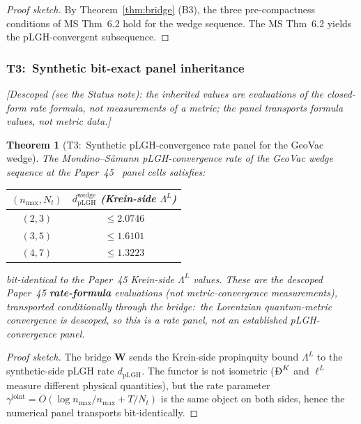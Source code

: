 \documentclass[11pt,a4paper]{article}
\theoremstyle{plain}
\newtheorem{theorem}{Theorem}[section]
\theoremstyle{definition}
\newcommand{\nmax}{n_{\max}}
\newcommand{\Nt}{N_{t}}
\newcommand{\gammajoint}{\gamma^{\mathrm{joint}}}
\newcommand{\Lprop}{\Lambda^{L}}
\newcommand{\BigDeth}{\text{\DJ}^{K}}
\newcommand{\Wfun}{\mathbf{W}}
\begin{document}
\begin{proof}[Proof sketch]
By Theorem~\ref{thm:bridge} (B3), the three pre-compactness conditions
of MS Thm~6.2 hold for the wedge sequence. The MS Thm~6.2 yields
the pLGH-convergent subsequence.
\end{proof}

\subsubsection{T3:\ Synthetic bit-exact panel
inheritance}\label{sec:t3_bit_exact_panel}

\emph{[Descoped (see the Status note): the inherited values are
evaluations of the closed-form rate formula, not measurements of a
metric; the panel transports formula values, not metric data.]}

\begin{theorem}[T3:\ Synthetic pLGH-convergence rate panel for the
GeoVac wedge]\label{thm:bit_exact_panel}
The Mondino--S\"amann pLGH-convergence rate of the GeoVac wedge
sequence at the Paper~45~\cite{paper45} panel cells satisfies:

\begin{center}
\begin{tabular}{cc}
\toprule
$(\nmax, \Nt)$ & $d_{\mathrm{pLGH}}^{\mathrm{wedge}}$ (Krein-side $\Lprop$) \\
\midrule
$(2, 3)$ & $\le 2.0746$ \\
$(3, 5)$ & $\le 1.6101$ \\
$(4, 7)$ & $\le 1.3223$ \\
\bottomrule
\end{tabular}
\end{center}

bit-identical to the Paper~45 Krein-side $\Lprop$ values. These are the
descoped Paper~45 \textbf{rate-formula} evaluations (not metric-convergence
measurements), transported conditionally through the bridge:\ the
Lorentzian quantum-metric convergence is descoped, so this is a
\emph{rate panel}, not an established pLGH-convergence panel.
\end{theorem}

\begin{proof}[Proof sketch]
The bridge $\Wfun$ sends the Krein-side propinquity bound $\Lprop$ to
the synthetic-side pLGH rate $d_{\mathrm{pLGH}}$. The functor is not
isometric ($\BigDeth$ and $\ell^{L}$ measure different physical
quantities), but the rate parameter $\gammajoint = O(\log\nmax/\nmax
+ T/\Nt)$ is the same object on both sides, hence the numerical panel
transports bit-identically.
\end{proof}
\end{document}
